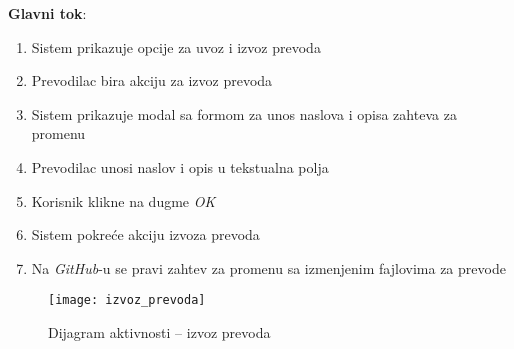 \textbf{Glavni tok}:
\begin{enumerate}
    \item Sistem prikazuje opcije za uvoz i izvoz prevoda
    \item Prevodilac bira akciju za izvoz prevoda
    \item Sistem prikazuje modal sa formom za unos naslova i opisa 
    zahteva za promenu
    \item Prevodilac unosi naslov i opis u tekstualna polja
    \item Korisnik klikne na dugme \textit{OK}
    \item Sistem pokreće akciju izvoza prevoda
    \item Na \textit{GitHub}-u se pravi zahtev za promenu sa izmenjenim fajlovima za prevode
\end{enumerate}

\begin{figure}[H]
    \centering
    \texttt{[image: izvoz\_prevoda]}
    \caption{Dijagram aktivnosti -- izvoz prevoda}
\end{figure}
